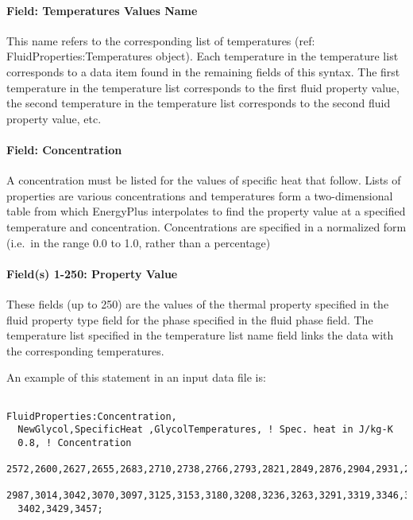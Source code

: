\paragraph{Field: Temperatures Values Name}\label{field-temperatures-values-name-2}

This name refers to the corresponding list of temperatures (ref: FluidProperties:Temperatures object). Each temperature in the temperature list corresponds to a data item found in the remaining fields of this syntax. The first temperature in the temperature list corresponds to the first fluid property value, the second temperature in the temperature list corresponds to the second fluid property value, etc.

\paragraph{Field: Concentration}\label{field-concentration}

A concentration must be listed for the values of specific heat that follow. Lists of properties are various concentrations and temperatures form a two-dimensional table from which EnergyPlus interpolates to find the property value at a specified temperature and concentration. Concentrations are specified in a normalized form (i.e.~in the range 0.0 to 1.0, rather than a percentage)

\paragraph{Field(s) 1-250: Property Value}\label{fields-1-250-property-value-2}

These fields (up to 250) are the values of the thermal property specified in the fluid property type field for the phase specified in the fluid phase field. The temperature list specified in the temperature list name field links the data with the corresponding temperatures.

An example of this statement in an input data file is:

\begin{lstlisting}

FluidProperties:Concentration,
  NewGlycol,SpecificHeat ,GlycolTemperatures, ! Spec. heat in J/kg-K
  0.8, ! Concentration
  2572,2600,2627,2655,2683,2710,2738,2766,2793,2821,2849,2876,2904,2931,2959,
  2987,3014,3042,3070,3097,3125,3153,3180,3208,3236,3263,3291,3319,3346,3374,
  3402,3429,3457;
\end{lstlisting}